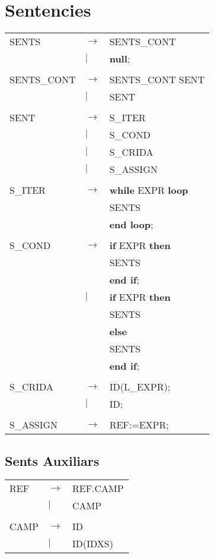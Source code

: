 \documentclass{article}
\begin{document}
	\section{Sentencies}
	\begin{tabular}{l l l}
		SENTS&$\to$&SENTS\_CONT\\
		&$|$&\textbf{null};\\
		\\
		SENTS\_CONT&$\to$&SENTS\_CONT SENT\\
		&$|$&SENT\\
		\\
		SENT&$\to$&S\_ITER\\
		&$|$&S\_COND\\
		&$|$&S\_CRIDA\\
		&$|$&S\_ASSIGN\\
		\\
		S\_ITER&$\to$&\textbf{while} EXPR \textbf{loop}\\
		&&\hspace*{5mm}SENTS\\
		&&\textbf{end loop};\\
		\\
		S\_COND&$\to$&\textbf{if} EXPR \textbf{then}\\
		&&\hspace*{5mm}SENTS\\
		&&\textbf{end if};\\
		&$|$&\textbf{if} EXPR \textbf{then}\\
		&&\hspace*{5mm}SENTS\\
		&&\textbf{else}\\
		&&\hspace*{5mm}SENTS\\
		&&\textbf{end if};\\
		\\
		S\_CRIDA&$\to$&ID(L\_EXPR);\\
		&$|$&ID;\\
		\\
		S\_ASSIGN&$\to$&REF:=EXPR;
	\end{tabular}
	\subsection{Sents Auxiliars}
	\begin{tabular}{l l l}
		REF&$\to$&REF.CAMP\\
		&$|$&CAMP\\
		\\
		CAMP&$\to$&ID\\
		&$|$&ID(IDXS)
	\end{tabular}
\end{document}
